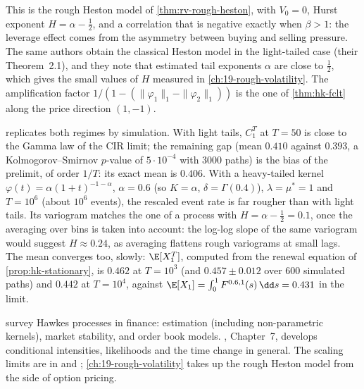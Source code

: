 This is the rough Heston model of \cref{thm:rv-rough-heston}, with $V_0=0$, Hurst exponent $H=\alpha-\frac12$, and a
correlation that is negative exactly when $\beta>1$: the leverage effect comes from the asymmetry between buying
and selling pressure. The same authors obtain the classical Heston model in the light-tailed case (their
Theorem~2.1), and they note that estimated tail exponents $\alpha$ are close to $\frac12$, which gives the small
values of $H$ measured in \cref{ch:19-rough-volatility}. The amplification factor $1/(1-(\|\varphi_1\|_1-\|\varphi_2\|_1))$
is the one of \cref{thm:hk-fclt} along the price direction $(1,-1)$.

 replicates both regimes by simulation. With light tails, $C^T_1$ at $T=50$ is
close to the Gamma law of the CIR limit; the remaining gap (mean $0.410$ against $0.393$, a Kolmogorov--Smirnov
$p$-value of $5\cdot10^{-4}$ with $3000$ paths) is the bias of the prelimit, of order $1/T$: its exact mean is $0.406$. With a heavy-tailed kernel
$\varphi(t)=\alpha(1+t)^{-1-\alpha}$, $\alpha=0.6$ (so $K=\alpha$, $\delta=\Gamma(0.4)$), $\lambda=\mu^*=1$ and $T=10^6$
(about $10^6$ events), the rescaled event rate is far rougher than with light tails. Its variogram matches the
one of a process with $H=\alpha-\frac12=0.1$, once the averaging over bins is taken into account: the log-log
slope of the same variogram would suggest $H\approx0.24$, as averaging flattens rough variograms at small lags.
The mean converges too, slowly: $\E[X^T_1]$, computed from the renewal equation of \cref{prop:hk-stationary}, is
$0.462$ at $T=10^3$ (and $0.457\pm0.012$ over $600$ simulated paths) and $0.442$ at $T=10^4$, against
$\E[X_1]=\int_0^1F^{0.6,1}(s)\,\dd s=0.431$ in the limit.



\furtherreading
\textcite{bacry-mastromatteo-muzy-2015} survey Hawkes processes in finance: estimation (including
non-parametric kernels), market stability, and order book models. \textcite{daley-vere-jones-2003}, Chapter~7,
develops conditional intensities, likelihoods and the time change in general. The scaling limits are in
\textcite{jaisson-rosenbaum-2015,jaisson-rosenbaum-2016} and \textcite{el-euch-fukasawa-rosenbaum-2018};
\cref{ch:19-rough-volatility} takes up the rough Heston model from the side of option pricing.
